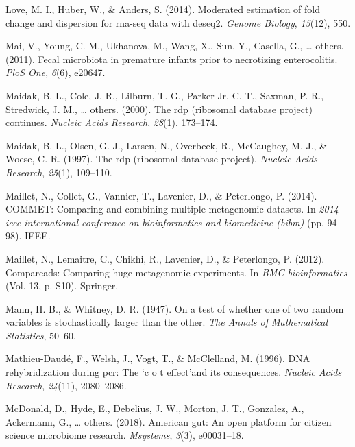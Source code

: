 \documentclass[12pt,a4paper]{reedthesis}
\theoremstyle{definition}
\theoremstyle{definition}
\theoremstyle{definition}
\theoremstyle{remark}
\begin{document}
\leavevmode\hypertarget{ref-love2014moderated}{}%
Love, M. I., Huber, W., \& Anders, S. (2014). Moderated estimation of fold change and dispersion for rna-seq data with deseq2. \emph{Genome Biology}, \emph{15}(12), 550.

\leavevmode\hypertarget{ref-mai2011fecal}{}%
Mai, V., Young, C. M., Ukhanova, M., Wang, X., Sun, Y., Casella, G., \ldots{} others. (2011). Fecal microbiota in premature infants prior to necrotizing enterocolitis. \emph{PloS One}, \emph{6}(6), e20647.

\leavevmode\hypertarget{ref-maidak2000rdp}{}%
Maidak, B. L., Cole, J. R., Lilburn, T. G., Parker Jr, C. T., Saxman, P. R., Stredwick, J. M., \ldots{} others. (2000). The rdp (ribosomal database project) continues. \emph{Nucleic Acids Research}, \emph{28}(1), 173--174.

\leavevmode\hypertarget{ref-maidak1997rdp}{}%
Maidak, B. L., Olsen, G. J., Larsen, N., Overbeek, R., McCaughey, M. J., \& Woese, C. R. (1997). The rdp (ribosomal database project). \emph{Nucleic Acids Research}, \emph{25}(1), 109--110.

\leavevmode\hypertarget{ref-maillet2014commet}{}%
Maillet, N., Collet, G., Vannier, T., Lavenier, D., \& Peterlongo, P. (2014). COMMET: Comparing and combining multiple metagenomic datasets. In \emph{2014 ieee international conference on bioinformatics and biomedicine (bibm)} (pp. 94--98). IEEE.

\leavevmode\hypertarget{ref-maillet2012compareads}{}%
Maillet, N., Lemaitre, C., Chikhi, R., Lavenier, D., \& Peterlongo, P. (2012). Compareads: Comparing huge metagenomic experiments. In \emph{BMC bioinformatics} (Vol. 13, p. S10). Springer.

\leavevmode\hypertarget{ref-mann1947test}{}%
Mann, H. B., \& Whitney, D. R. (1947). On a test of whether one of two random variables is stochastically larger than the other. \emph{The Annals of Mathematical Statistics}, 50--60.

\leavevmode\hypertarget{ref-mathieu1996dna}{}%
Mathieu-Daudé, F., Welsh, J., Vogt, T., \& McClelland, M. (1996). DNA rehybridization during pcr: The `c o t effect'and its consequences. \emph{Nucleic Acids Research}, \emph{24}(11), 2080--2086.

\leavevmode\hypertarget{ref-mcdonald2018american}{}%
McDonald, D., Hyde, E., Debelius, J. W., Morton, J. T., Gonzalez, A., Ackermann, G., \ldots{} others. (2018). American gut: An open platform for citizen science microbiome research. \emph{Msystems}, \emph{3}(3), e00031--18.
\end{document}
